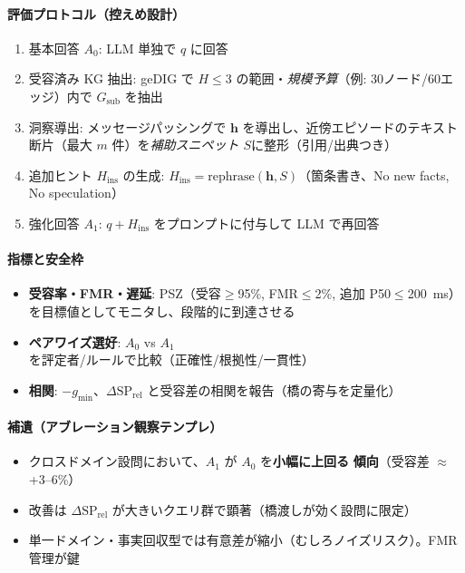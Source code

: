 \documentclass[ja=standard,xelatex]{bxjsarticle}
\begin{document}
\paragraph{評価プロトコル（控えめ設計）}
\begin{enumerate}[leftmargin=1.4em]
  \item 基本回答 $A_0$: LLM 単独で $q$ に回答
  \item 受容済み KG 抽出: geDIG で $H\!\le\!3$ の範囲・\textit{規模予算}（例: 30ノード/60エッジ）内で $G_{\text{sub}}$ を抽出
  \item 洞察導出: メッセージパッシングで $\mathbf{h}$ を導出し、近傍エピソードのテキスト断片（最大 $m$ 件）を\textit{補助スニペット $S$}に整形（引用/出典つき）
  \item 追加ヒント $H_\text{ins}$ の生成: $H_\text{ins}=\mathrm{rephrase}(\mathbf{h},S)$（箇条書き、No new facts, No speculation）
  \item 強化回答 $A_1$: $q + H_\text{ins}$ をプロンプトに付与して LLM で再回答
\end{enumerate}

\paragraph{指標と安全枠}
\begin{itemize}[leftmargin=*]
  \item \textbf{受容率・FMR・遅延}: PSZ（受容$\geq$95\%, FMR$\leq$2\%, 追加 P50$\leq$\SI{200}{ms}）を目標値としてモニタし、段階的に到達させる
  \item \textbf{ペアワイズ選好}: $A_0$ vs $A_1$ を評定者/ルールで比較（正確性/根拠性/一貫性）
  \item \textbf{相関}: $-g_{\min}$、$\Delta \mathrm{SP}_{\mathrm{rel}}$ と受容差の相関を報告（橋の寄与を定量化）
\end{itemize}

\paragraph{補遺（アブレーション観察テンプレ）}
\begin{itemize}[leftmargin=*]
  \item クロスドメイン設問において、$A_1$ が $A_0$ を\textbf{小幅に上回る\,\,傾向}（受容差 $\approx$ +3--6\%）
  \item 改善は $\Delta \mathrm{SP}_{\mathrm{rel}}$ が大きいクエリ群で顕著（橋渡しが効く設問に限定）
  \item 単一ドメイン・事実回収型では有意差が縮小（むしろノイズリスク）。FMR 管理が鍵
\end{itemize}
\end{document}
